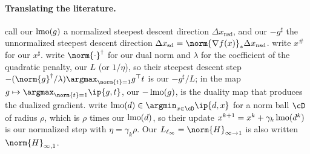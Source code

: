 \begin{refsection}
\paragraph{Translating the literature.} \Textcite{BoydVandenberghe2004} call our $\operatorname{lmo}(g)$ a normalized steepest descent direction $\Delta x_{\mathrm{nsd}}$, and our $-g^\sharp$ the unnormalized steepest descent direction $\Delta x_{\mathrm{sd}}=\norm{\nabla f(x)}_*\Delta x_{\mathrm{nsd}}$. \Textcite{KelnerEtAl2014} write $x^\#$ for our $x^\sharp$. \Textcite{BernsteinNewhouse2024} write $\norm{\cdot}^\dagger$ for our dual norm and $\lambda$ for the coefficient of the quadratic penalty, our $L$ (or $1/\eta$), so their steepest descent step $-(\norm{g}^\dagger/\lambda)\argmax_{\norm{t}=1}g^\top t$ is our $-g^\sharp/L$; in \textcite{BernsteinNewhouse2025} the map $g\mapsto\argmax_{\norm{t}=1}\ip{g,t}$, our $-\operatorname{lmo}(g)$, is the duality map that produces the dualized gradient. \Textcite{PethickEtAl2025} write $\lmo(d)\in\argmin_{x\in\cD}\ip{d,x}$ for a norm ball $\cD$ of radius $\rho$, which is $\rho$ times our $\operatorname{lmo}(d)$, so their update $x^{k+1}=x^k+\gamma_k\operatorname{lmo}(d^k)$ is our normalized step with $\eta=\gamma_k\rho$. Our $L_{\ell_\infty}=\norm{H}_{\infty\to1}$ is also written $\norm{H}_{\infty,1}$.

\printchapterbib
\end{refsection}
